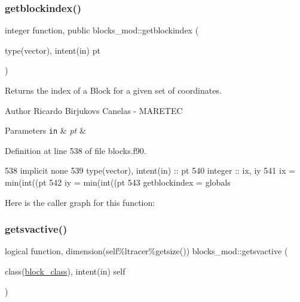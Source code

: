 \subsubsection{\texorpdfstring{getblockindex()}{getblockindex()}}
{\footnotesize\ttfamily integer function, public blocks\+\_\+mod\+::getblockindex (\begin{DoxyParamCaption}\item[{type(vector), intent(in)}]{pt }\end{DoxyParamCaption})}



Returns the index of a Block for a given set of coordinates. 

\begin{DoxyAuthor}{Author}
Ricardo Birjukovs Canelas -\/ M\+A\+R\+E\+T\+EC 
\end{DoxyAuthor}

\begin{DoxyParams}[1]{Parameters}
\mbox{\tt in}  & {\em pt} & \\
\hline
\end{DoxyParams}


Definition at line 538 of file blocks.\+f90.


\begin{DoxyCode}
538     \textcolor{keywordtype}{implicit none}
539     \textcolor{keywordtype}{type}(vector), \textcolor{keywordtype}{intent(in)} :: pt
540     \textcolor{keywordtype}{integer} :: ix, iy
541     ix = min(int((pt%
542     iy = min(int((pt%
543     getblockindex = globals%
\end{DoxyCode}
Here is the caller graph for this function\+:
\mbox{\label{namespaceblocks__mod_a2fdac72f343c10f38d1acb3f5779de18}} 
\subsubsection{\texorpdfstring{getsvactive()}{getsvactive()}}
{\footnotesize\ttfamily logical function, dimension(self\%ltracer\%getsize()) blocks\+\_\+mod\+::getsvactive (\begin{DoxyParamCaption}\item[{class(\mbox{\hyperlink{structblocks__mod_1_1block__class}{block\+\_\+class}}), intent(in)}]{self }\end{DoxyParamCaption})\hspace{0.3cm}{\ttfamily [private]}}




